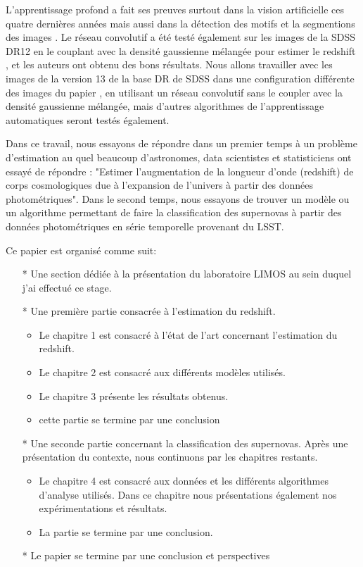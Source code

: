 \documentclass[french]{report}
\begin{document}
L'apprentissage profond a fait ses preuves surtout dans la vision artificielle\cite{im1, im2} ces quatre dernières années mais aussi dans la détection des motifs et la segmentions des images \cite{rcnn}. Le réseau convolutif a été testé également sur les images de la SDSS DR12 en le couplant avec la densité gaussienne mélangée pour estimer le redshift \cite{isanto}, et les auteurs ont obtenu des bons résultats. Nous allons travailler avec les images de la version 13 de la base DR de SDSS dans une configuration différente des images du papier \cite{isanto}, en utilisant un réseau convolutif sans le coupler avec la densité gaussienne mélangée, mais d'autres algorithmes de l'apprentissage automatiques seront testés également. 

Dans ce travail, nous essayons de répondre dans un premier temps à un problème d'estimation au quel beaucoup d'astronomes, data scientistes et statisticiens ont essayé de répondre : "Estimer l'augmentation de la longueur d'onde (redshift) de corps cosmologiques due à l'expansion de l'univers à partir des données photométriques". Dans le second temps, nous essayons de trouver un modèle ou un algorithme permettant de faire la classification des supernovas à partir des données photométriques en série temporelle provenant du LSST. 

Ce papier est organisé comme suit:
\begin{itemize}
	\item [*] Une section dédiée à la présentation du laboratoire LIMOS au sein duquel j'ai effectué ce stage.
	\item[*]  Une première partie consacrée à l'estimation du redshift.
	\begin{itemize}
		\item Le chapitre 1 est consacré à l'état de l'art concernant l'estimation du redshift.
		\item Le chapitre 2 est consacré aux différents modèles utilisés.
		\item Le chapitre 3 présente les résultats obtenus.
		\item cette partie se termine par une conclusion
	\end{itemize}
	\item[*]  Une seconde partie concernant la classification des supernovas. Après une présentation du contexte, nous continuons par les chapitres restants.
	\begin{itemize}
		\item Le chapitre 4 est consacré aux données et les différents algorithmes d'analyse utilisés. Dans ce chapitre nous présentations également nos expérimentations et résultats.
		\item La partie se termine par une conclusion.
	\end{itemize}
	\item[*] Le papier se termine par une conclusion et perspectives
\end{itemize}      
\end{document}

